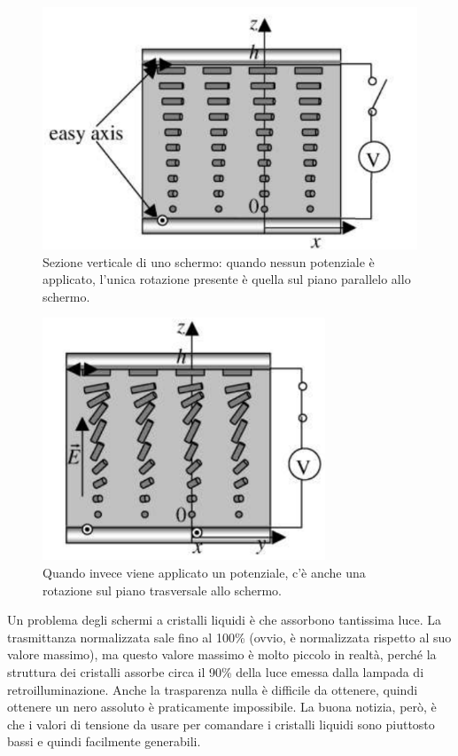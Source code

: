\documentclass[a4paper,11pt]{article}
\begin{document}
\renewcommand{\thefigure}{4.2}
\begin{figure}[!h]
  \centering
    \includegraphics[scale=0.6]{images/4/no_voltage.png}
    \caption{Sezione verticale di uno schermo: quando nessun potenziale è applicato, l'unica rotazione presente è quella sul piano parallelo allo schermo.}
\end{figure}

\renewcommand{\thefigure}{4.3}
\begin{figure}[!h]
  \centering
    \includegraphics[scale=0.6]{images/4/yes_voltage.png}
    \caption{Quando invece viene applicato un potenziale, c'è anche una rotazione sul piano trasversale allo schermo.}
\end{figure}

Un problema degli schermi a cristalli liquidi è che assorbono tantissima luce. La trasmittanza normalizzata
sale fino al 100\% (ovvio, è normalizzata rispetto al suo valore massimo), ma questo valore massimo è molto piccolo in realtà, perché la struttura dei cristalli
assorbe circa il 90\% della luce emessa dalla lampada di retroilluminazione.
Anche la trasparenza nulla è difficile da ottenere, quindi ottenere un nero assoluto è praticamente impossibile. La buona notizia, però, è che i valori di tensione da usare per comandare
i cristalli liquidi sono piuttosto bassi e quindi facilmente generabili.
\end{document}
